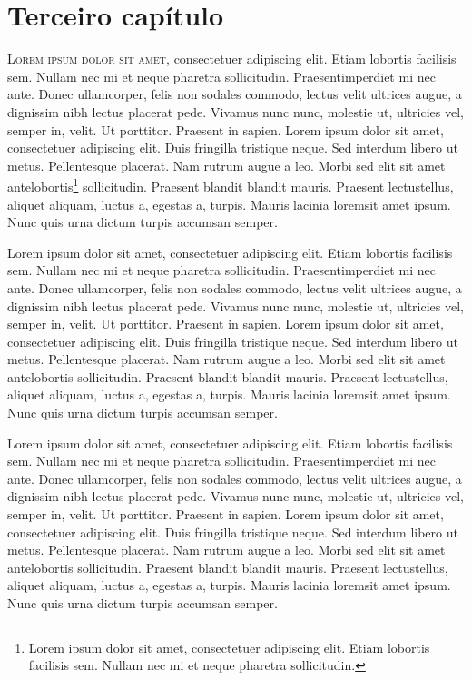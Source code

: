 \chapter{Terceiro capítulo}

\lettrine{L}{orem ipsum dolor sit amet}, consectetuer adipiscing elit. Etiam lobortis facilisis sem. Nullam nec mi et neque pharetra sollicitudin. Praesentimperdiet mi nec ante. Donec ullamcorper, felis non sodales commodo, lectus velit ultrices augue, a dignissim nibh lectus placerat pede. Vivamus nunc nunc, molestie ut, ultricies vel, semper in, velit. Ut porttitor. Praesent in sapien. Lorem ipsum dolor sit amet, consectetuer adipiscing elit. Duis fringilla tristique neque. Sed interdum libero ut metus. Pellentesque placerat. Nam rutrum augue a leo. Morbi sed elit sit amet antelobortis\footnote{Lorem ipsum dolor sit amet, consectetuer adipiscing elit. Etiam lobortis facilisis sem. Nullam nec mi et neque pharetra sollicitudin.} sollicitudin. Praesent blandit blandit mauris. Praesent lectustellus, aliquet aliquam, luctus a, egestas a, turpis. Mauris lacinia loremsit amet ipsum. Nunc quis urna dictum turpis accumsan semper.

Lorem ipsum dolor sit amet, consectetuer adipiscing elit. Etiam lobortis facilisis sem. Nullam nec mi et neque pharetra sollicitudin. Praesentimperdiet mi nec ante. Donec ullamcorper, felis non sodales commodo, lectus velit ultrices augue, a dignissim nibh lectus placerat pede. Vivamus nunc nunc, molestie ut, ultricies vel, semper in, velit. Ut porttitor. Praesent in sapien. Lorem ipsum dolor sit amet, consectetuer adipiscing elit. Duis fringilla tristique neque. Sed interdum libero ut metus. Pellentesque placerat. Nam rutrum augue a leo. Morbi sed elit sit amet antelobortis sollicitudin. Praesent blandit blandit mauris. Praesent lectustellus, aliquet aliquam, luctus a, egestas a, turpis. Mauris lacinia loremsit amet ipsum. Nunc quis urna dictum turpis accumsan semper.

Lorem ipsum dolor sit amet, consectetuer adipiscing elit. Etiam lobortis facilisis sem. Nullam nec mi et neque pharetra sollicitudin. Praesentimperdiet mi nec ante. Donec ullamcorper, felis non sodales commodo, lectus velit ultrices augue, a dignissim nibh lectus placerat pede. Vivamus nunc nunc, molestie ut, ultricies vel, semper in, velit. Ut porttitor. Praesent in sapien. Lorem ipsum dolor sit amet, consectetuer adipiscing elit. Duis fringilla tristique neque. Sed interdum libero ut metus. Pellentesque placerat. Nam rutrum augue a leo. Morbi sed elit sit amet antelobortis sollicitudin. Praesent blandit blandit mauris. Praesent lectustellus, aliquet aliquam, luctus a, egestas a, turpis. Mauris lacinia loremsit amet ipsum. Nunc quis urna dictum turpis accumsan semper.